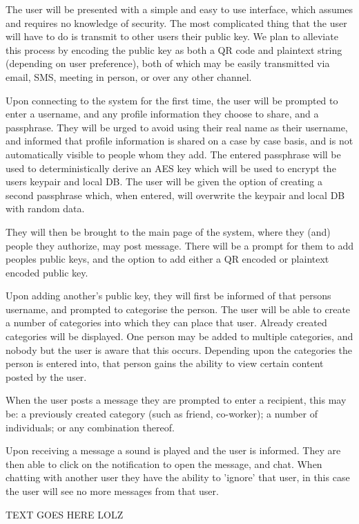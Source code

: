 The user will be presented with a simple and easy to use interface, which
assumes and requires no knowledge of security. The most complicated thing that
the user will have to do is transmit to other users their public key. We plan
to alleviate this process by encoding the public key as both a QR code and
plaintext string (depending on user preference), both of which may be easily
transmitted via email, SMS, meeting in person, or over any other channel.

Upon connecting to the system for the first time, the user will be prompted to
enter a username, and any profile information they choose to share, and a
passphrase. They will be urged to avoid using their real name as their username,
and informed that profile information is shared on a case by case basis, and is
not automatically visible to people whom they add. The entered passphrase will
be used to deterministically derive an AES key which will be used to encrypt the
users keypair and local DB. The user will be given the option of creating a
second passphrase which, when entered, will overwrite the keypair and local DB
with random data.

They will then be brought to the main page of the system, where they (and)
people they authorize, may post message. There will be a prompt for them to add
peoples public keys, and the option to add either a QR encoded or plaintext
encoded public key.

Upon adding another's public key, they will first be informed of that persons
username, and prompted to categorise the person. The user will be able to create
a number of categories into which they can place that user. Already created
categories will be displayed. One person may be added to multiple categories,
and nobody but the user is aware that this occurs. Depending upon the categories
the person is entered into, that person gains the ability to view certain
content posted by the user.

When the user posts a message they are prompted to enter a recipient, this may
be: a previously created category (such as friend, co-worker); a number
of individuals; or any combination thereof.

Upon receiving a message a sound is played and the user is informed. They are
then able to click on the notification to open the message, and chat. When
chatting with another user they have the ability to 'ignore' that user, in this
case the user will see no more messages from that user.

TEXT GOES HERE LOLZ

